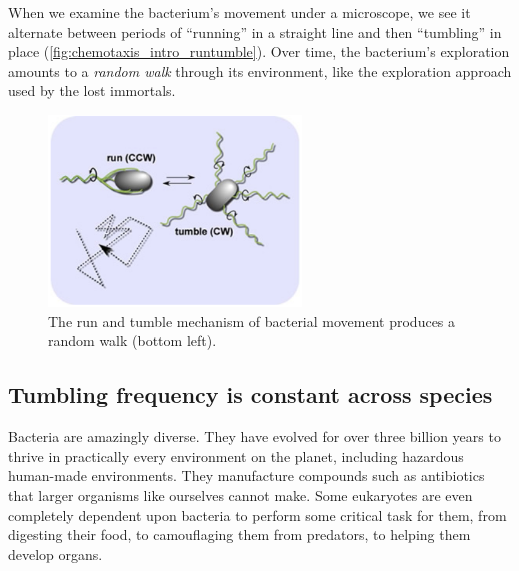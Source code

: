 When we examine the bacterium's movement under a microscope, we see it alternate between periods of ``running'' in a straight line and then ``tumbling'' in place (\autoref{fig:chemotaxis_intro_runtumble}). Over time, the bacterium's  exploration amounts to a \textit{random walk} through its environment, like the exploration approach used by the lost immortals.\\

\begin{figure}[h]
\centering
\mySfFamily
\includegraphics[width = 0.6\textwidth]{../images/chemotaxis_intro_runtumble.png}
\caption{The run and tumble mechanism of bacterial movement produces a random walk (bottom left).}
\label{fig:chemotaxis_intro_runtumble}
\end{figure}

\begin{qbox}\end{qbox}

\FloatBarrier
{}
\subsection{Tumbling frequency is constant across species}

Bacteria are amazingly diverse. They have evolved for over three billion years to thrive in practically every environment on the planet, including hazardous human-made environments. They manufacture compounds such as antibiotics that larger organisms like ourselves cannot make. Some eukaryotes are even completely dependent upon bacteria to perform some critical task for them, from digesting their food, to camouflaging them from predators, to helping them develop organs.

